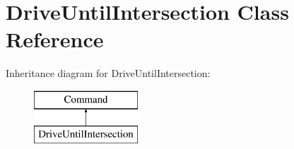 \hypertarget{classDriveUntilIntersection}{\section{Drive\-Until\-Intersection Class Reference}
\label{classDriveUntilIntersection}
}
Inheritance diagram for Drive\-Until\-Intersection\-:\begin{figure}[H]
\begin{center}
\leavevmode
\includegraphics[height=2.000000cm]{classDriveUntilIntersection}
\end{center}
\end{figure}
